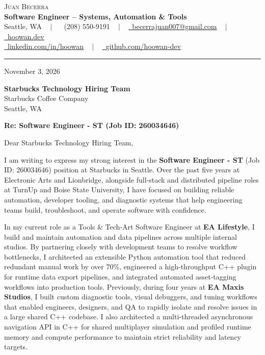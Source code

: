 \documentclass[letterpaper,11pt]{article}
\begin{document}
\begin{center}
    {\Huge \scshape Juan Becerra} \\ \vspace{4pt}
    \textbf{\large Software Engineer -- Systems, Automation \& Tools} \\ \vspace{4pt}
    \small Seattle, WA ~ $|$ ~
    \raisebox{-0.1\height}\faPhone\ (208) 550-9191 ~ $|$ ~
    \href{mailto:becerrajuan007@gmail.com}{\raisebox{-0.2\height}\faEnvelope\ \underline{becerrajuan007@gmail.com}} ~ $|$ ~
    \href{https://hoowan.dev}{\raisebox{-0.2\height}\faGlobe\ \underline{hoowan.dev}} \\ \vspace{2pt}
    \href{https://linkedin.com/in/hoowan/}{\raisebox{-0.2\height}\faLinkedin\ \underline{linkedin.com/in/hoowan}} ~ $|$ ~
    \href{https://github.com/hoowan-dev}{\raisebox{-0.2\height}\faGithub\ \underline{github.com/hoowan-dev}}
\end{center}

\vspace{4pt}
\hrule
\vspace{14pt}

\noindent November 3, 2026

\vspace{8pt}
\noindent \textbf{Starbucks Technology Hiring Team} \\
Starbucks Coffee Company \\
Seattle, WA

\vspace{8pt}
\noindent \textbf{Re: Software Engineer - ST (Job ID: 260034646)}

\vspace{8pt}
\noindent Dear Starbucks Technology Hiring Team,

I am writing to express my strong interest in the \textbf{Software Engineer - ST} (Job ID: 260034646)
position at Starbucks in Seattle. Over the past five years at Electronic Arts and Lionbridge, alongside full-stack
and distributed pipeline roles at TurnUp and Boise State University, I have focused on building reliable
automation, developer tooling, and diagnostic systems that help engineering teams build, troubleshoot, and
operate software with confidence.

In my current role as a Tools \& Tech-Art Software Engineer at \textbf{EA Lifestyle}, I build and maintain
automation and data pipelines across multiple internal studios. By partnering closely with development teams
to resolve workflow bottlenecks, I architected an extensible Python automation tool that reduced redundant
manual work by over 70\%, engineered a high-throughput C++ plugin for runtime data export pipelines, and
integrated automated asset-tagging workflows into production tools. Previously, during four years at
\textbf{EA Maxis Studios}, I built custom diagnostic tools, visual debuggers, and tuning workflows that enabled
engineers, designers, and QA to rapidly isolate and resolve issues in a large shared C++ codebase. I also
architected a multi-threaded asynchronous navigation API in C++ for shared multiplayer simulation and profiled
runtime memory and compute performance to maintain strict reliability and latency targets.
\end{document}
